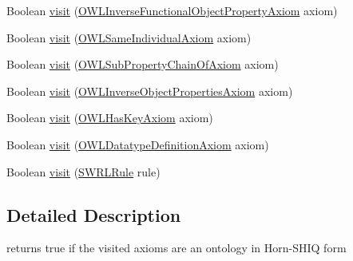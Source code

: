 \begin{DoxyCompactItemize}
Boolean \hyperlink{classorg_1_1semanticweb_1_1owlapi_1_1util_1_1_horn_axiom_visitor_ex_a4e2e81b1d241598f4950ddb247d12b9c}{visit} (\hyperlink{interfaceorg_1_1semanticweb_1_1owlapi_1_1model_1_1_o_w_l_inverse_functional_object_property_axiom}{O\-W\-L\-Inverse\-Functional\-Object\-Property\-Axiom} axiom)
\item 
Boolean \hyperlink{classorg_1_1semanticweb_1_1owlapi_1_1util_1_1_horn_axiom_visitor_ex_af4c774cfe9451c6a18f58adb8e0fe12f}{visit} (\hyperlink{interfaceorg_1_1semanticweb_1_1owlapi_1_1model_1_1_o_w_l_same_individual_axiom}{O\-W\-L\-Same\-Individual\-Axiom} axiom)
\item 
Boolean \hyperlink{classorg_1_1semanticweb_1_1owlapi_1_1util_1_1_horn_axiom_visitor_ex_a62152fa1a8e3468abcdb18548717bbcb}{visit} (\hyperlink{interfaceorg_1_1semanticweb_1_1owlapi_1_1model_1_1_o_w_l_sub_property_chain_of_axiom}{O\-W\-L\-Sub\-Property\-Chain\-Of\-Axiom} axiom)
\item 
Boolean \hyperlink{classorg_1_1semanticweb_1_1owlapi_1_1util_1_1_horn_axiom_visitor_ex_a7ecf9c8d14780d7ecb8c785f457c6039}{visit} (\hyperlink{interfaceorg_1_1semanticweb_1_1owlapi_1_1model_1_1_o_w_l_inverse_object_properties_axiom}{O\-W\-L\-Inverse\-Object\-Properties\-Axiom} axiom)
\item 
Boolean \hyperlink{classorg_1_1semanticweb_1_1owlapi_1_1util_1_1_horn_axiom_visitor_ex_ae2d3cd43d6b4683e2cc3ff33ecb47644}{visit} (\hyperlink{interfaceorg_1_1semanticweb_1_1owlapi_1_1model_1_1_o_w_l_has_key_axiom}{O\-W\-L\-Has\-Key\-Axiom} axiom)
\item 
Boolean \hyperlink{classorg_1_1semanticweb_1_1owlapi_1_1util_1_1_horn_axiom_visitor_ex_aef6dcd8ea90306b0f279f4828c187f61}{visit} (\hyperlink{interfaceorg_1_1semanticweb_1_1owlapi_1_1model_1_1_o_w_l_datatype_definition_axiom}{O\-W\-L\-Datatype\-Definition\-Axiom} axiom)
\item 
Boolean \hyperlink{classorg_1_1semanticweb_1_1owlapi_1_1util_1_1_horn_axiom_visitor_ex_ada96fd99eb18448faba604343fe573f1}{visit} (\hyperlink{interfaceorg_1_1semanticweb_1_1owlapi_1_1model_1_1_s_w_r_l_rule}{S\-W\-R\-L\-Rule} rule)
\end{DoxyCompactItemize}


\subsection{Detailed Description}
returns true if the visited axioms are an ontology in Horn-\/\-S\-H\-I\-Q form 

